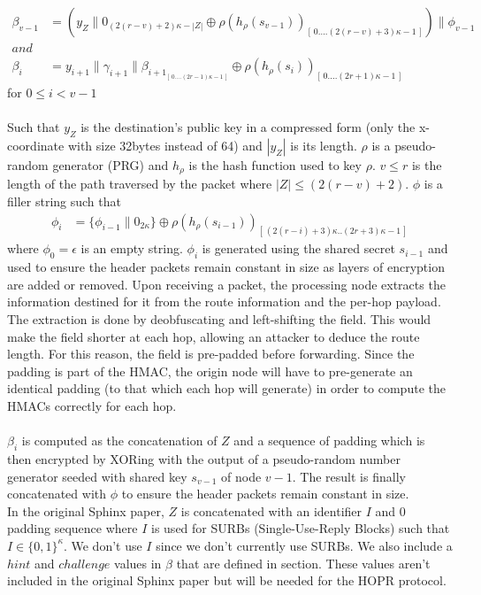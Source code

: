     \begin{align}  
            \beta_{v-1} &=(y_Z\|0_{(2(r-v)+2)\kappa-|Z|}\oplus \rho(h_{\rho}(s_{v-1}))_{[ \,0....(2(r-v)+3)\kappa-1\,]})\|\phi_{v-1}\\
            and &\nonumber \\
            \beta_i &=y_{i+1}\|\gamma_{i+1}\|\beta_{{i+1}_{[ \,0....(2r-1)\kappa-1\,] }}\oplus \rho(h_{\rho}(s_{i}))_{[ \,0....(2r+1)\kappa-1\,]} 
            \label{eq:2}
    \end{align}
for $0\le i < v-1$
    \\~\\Such that $y_Z$ is the destination's public key in a compressed form (only the x-coordinate with size 32bytes instead of 64) and $|y_Z|$ is its length. $\rho$ is a pseudo-random generator (PRG) and $h_{\rho}$ is the hash function used to key $\rho$.
    $v\leq r$ is the length of the path traversed by the packet where $|Z| \leq (2(r - v) + 2)$. $\phi$ is a filler string such that
    \begin{align}  
        \phi_i&=\{ \phi_{i-1}\|0_{2\kappa}\}\oplus \rho(h_{\rho}(s_{i-1}))_{[ \,(2(r-i)+3)\kappa..(2r+3)\kappa-1\,]}
\end{align}
where $\phi_0=\epsilon$ is an empty string. $\phi_i$ is generated using the shared secret $s_{i-1}$ and used to ensure the header packets remain constant in size as layers of encryption are added or removed. Upon receiving a packet, the processing node extracts the information destined for it from the route information and the per-hop payload. The extraction is done by deobfuscating and left-shifting the field. This would make the field shorter at each hop, allowing an attacker to deduce the route length. For this reason, the field is pre-padded before forwarding. Since the padding is part of the HMAC, the origin node will have to pre-generate an identical padding (to that which each hop will generate) in order to compute the HMACs correctly for each hop.
    \\~\\$\beta_i$ is computed as the concatenation of $Z$ and a sequence of padding which is then encrypted by XORing with the output of a pseudo-random number generator seeded with shared key $s_{v-1}$ of node $v-1$. The result is finally concatenated with $\phi$ to ensure the header packets remain constant in size.
    \\In the original Sphinx paper, $Z$ is concatenated with an identifier $I$ and $0$ padding sequence where $I$ is used for SURBs (Single-Use-Reply Blocks) such that $I \in \{0, 1\}^\kappa$. We don't use $I$ since we don't currently use SURBs. We also include a $hint$ and $challenge$ values in $\beta$ that are defined in  section. These values aren't included in the original Sphinx paper but will be needed for the HOPR protocol.
